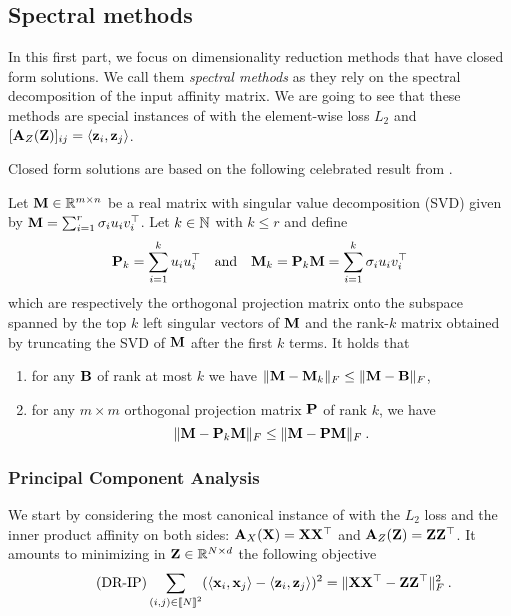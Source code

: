 \subsection{Spectral methods}\label{sec:spectral_methods}

In this first part, we focus on dimensionality reduction methods that have closed form solutions. We call them \emph{spectral methods} as they rely on the spectral decomposition of the input affinity matrix. We are going to see that these methods are special instances of  with the element-wise loss $L_2$ and $[{\mathbf{A}}_{Z}({\mathbf{Z}})]_{ij} = \langle {\mathbf{z}}_i, {\mathbf{z}}_j \rangle$.

Closed form solutions are based on the following celebrated result from \cite{eckart1936approximation}.

\begin{theorem}{\cite{eckart1936approximation}}\label{thm:eckart}
	Let ${\mathbf{M}} \in \mathbb{R}^{m \times n}$ be a real matrix with singular value decomposition (SVD) given by ${\mathbf{M}} = \sum_{i=1}^{r} \sigma_i u_i v_i^\top$. Let $k \in \mathbb{N}$ with $k \leq r$ and define 
	\begin{align}
		{\mathbf{P}}_k = \sum_{i=1}^{k} u_i u_i^\top \quad \text{and} \quad {\mathbf{M}}_k = {\mathbf{P}}_k {\mathbf{M}} = \sum_{i=1}^{k} \sigma_i u_i v_i^\top
	\end{align}
	which are respectively the orthogonal projection matrix onto the subspace spanned by the top $k$ left singular vectors of ${\mathbf{M}}$ and the rank-$k$ matrix obtained by truncating the SVD of ${\mathbf{M}}$ after the first $k$ terms. It holds that
	\begin{enumerate}[label=(\alph*)]
        \item for any ${\mathbf{B}}$ of rank at most $k$ we have $\| {\mathbf{M}} - {\mathbf{M}}_k \|_F \leq \| {\mathbf{M}} - {\mathbf{B}} \|_F$,
        \item for any $m \times m$ orthogonal projection matrix ${\mathbf{P}}$ of rank $k$, we have $$\| {\mathbf{M}} - {\mathbf{P}}_k {\mathbf{M}} \|_F \leq \| {\mathbf{M}} - {\mathbf{P}} {\mathbf{M}} \|_F \: .$$
    \end{enumerate} 
\end{theorem}

\subsubsection{Principal Component Analysis}

We start by considering the most canonical instance of  with the $L_2$ loss and the inner product affinity on both sides: ${\mathbf{A}}_X({\mathbf{X}}) = {\mathbf{X}} {\mathbf{X}}^\top$ and ${\mathbf{A}}_Z({\mathbf{Z}}) = {\mathbf{Z}} {\mathbf{Z}}^\top$. It amounts to minimizing in ${\mathbf{Z}} \in \mathbb{R}^{N \times d}$ the following objective
\begin{equation*}\label{eq:DR_IP}\tag{DR-IP}
	\sum_{(i,j) \in {[\![N]\!]}^2} (\langle {\mathbf{x}}_i, {\mathbf{x}}_j \rangle - \langle {\mathbf{z}}_i, {\mathbf{z}}_j \rangle)^2 = \| {\mathbf{X}} {\mathbf{X}}^\top - {\mathbf{Z}} {\mathbf{Z}}^\top \|_F^2 \:.
\end{equation*}

